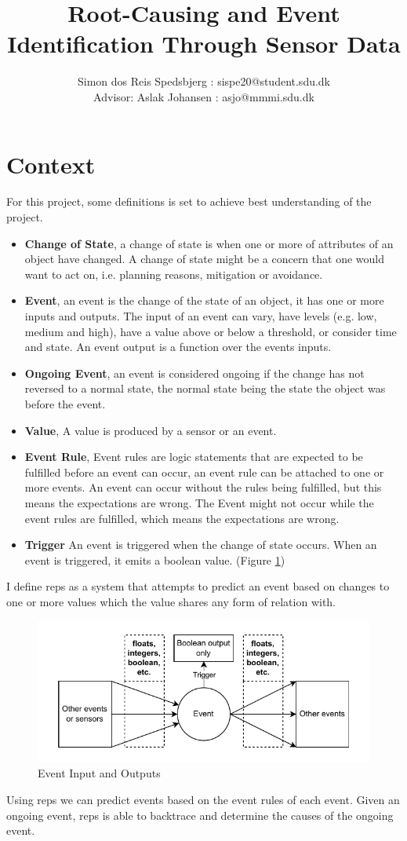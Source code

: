 \documentclass[a4paper,8pt]{article}
\title{Root-Causing and Event Identification Through Sensor Data}
\author{Simon dos Reis Spedsbjerg : sispe20@student.sdu.dk\\ {\small Advisor: Aslak Johansen : asjo@mmmi.sdu.dk}}
\begin{document}
	\maketitle
	\section{Context}
		
			For this project, some definitions is set to achieve best understanding of the project.
			\begin{itemize}
				\item \textbf{Change of State}, a change of state is when one or more of attributes of an object have changed. A change of state might be a concern that one would want to act on, i.e. planning reasons, mitigation or avoidance.
				\item \textbf{Event}, an event is the change of the state of an object, it has one or more inputs and outputs. The input of an event can vary, have levels (e.g. low, medium and high), have a value above or below a threshold, or consider time and state. An event output is a function over the events inputs.
				\item \textbf{Ongoing Event}, an event is considered ongoing if the change has not reversed to a normal state, the normal state being the state the object was before the event.
				\item \textbf{Value}, A value is produced by a sensor or an event.
				\item \textbf{Event Rule}, Event rules are logic statements that are expected to be fulfilled before an event can occur, an event rule can be attached to one or more events. An event can occur without the rules being fulfilled, but this means the expectations are wrong. The Event might not occur while the event rules are fulfilled, which means the expectations are wrong.%
				\item \textbf{Trigger} An event is triggered when the change of state occurs. When an event is triggered, it emits a boolean value. (Figure \ref{fig:eventInAOut})
			\end{itemize}
		I define \gls{reps} as a system that attempts to predict an event based on changes to one or more values which the value shares any form of relation with. 
		\begin{figure}[!h]
			\centering
			\includegraphics[width=.8\textwidth]{EventTrigger}
			\caption{Event Input and Outputs}
			\label{fig:eventInAOut}
		\end{figure}
		\newpage
		Using \gls{reps} we can predict events based on the event rules of each event. Given an ongoing event, \gls{reps} is able to backtrace and determine the causes of the ongoing event.
		
\end{document}
